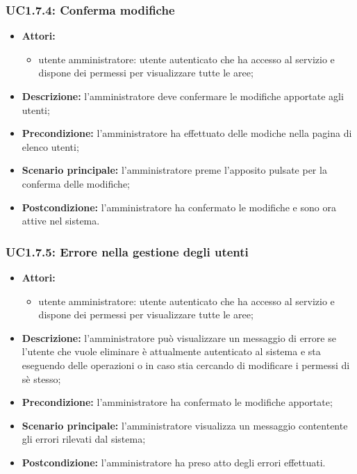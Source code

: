 \subsubsection{UC1.7.4: Conferma modifiche}
\begin{itemize}
	\item \textbf{Attori:}
	\begin{itemize}
		\item utente amministratore: utente autenticato che ha accesso al servizio e dispone dei permessi per visualizzare tutte le aree;
	\end{itemize}
	\item \textbf{Descrizione:} l'amministratore deve confermare le modifiche apportate agli utenti;
	\item \textbf{Precondizione:} l'amministratore ha effettuato delle modiche nella pagina di elenco utenti;
	\item \textbf{Scenario principale:} l'amministratore preme l'apposito pulsate per la conferma delle modifiche;
	\item \textbf{Postcondizione:} l'amministratore ha confermato le modifiche e sono ora attive nel sistema.
\end{itemize}

\subsubsection{UC1.7.5: Errore nella gestione degli utenti}
\begin{itemize}
	\item \textbf{Attori:}
	\begin{itemize}
		\item utente amministratore: utente autenticato che ha accesso al servizio e dispone dei permessi per visualizzare tutte le aree;
	\end{itemize}
	\item \textbf{Descrizione:} l’amministratore può visualizzare un messaggio di errore se l’utente che vuole eliminare è attualmente autenticato al sistema e sta eseguendo delle operazioni o in caso stia cercando di modificare i permessi di sè stesso;
	\item \textbf{Precondizione:} l'amministratore ha confermato le modifiche apportate;
	\item \textbf{Scenario principale:} l'amministratore visualizza un messaggio contentente gli errori rilevati dal sistema;
	\item \textbf{Postcondizione:} l'amministratore ha preso atto degli errori effettuati.
\end{itemize}

